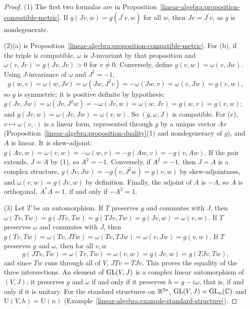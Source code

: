 \begin{proof}
(1) The first two formulas are in Proposition~\ref{linear-algebra:proposition-compatible-metric}. If $g(Jv, w) = g(J^{\prime}v, w)$ for all $w$, then $Jv = J^{\prime}v$, as $g$ is nondegenerate.

(2)(a) is Proposition~\ref{linear-algebra:proposition-compatible-metric}. For (b), if the triple is compatible, $\omega$ is $J$-invariant by that proposition and $\omega(v, Jv) = g(Jv, Jv) > 0$ for
$v \neq 0$. Conversely, define $g(v, w) = \omega(v, Jw)$. Using $J$-invariance of $\omega$ and $J^2 = -1$,
\[
g(w, v) = \omega(w, Jv) = \omega(Jw, J^2v) = -\omega(Jw, v) = \omega(v, Jw) = g(v, w),
\]
so $g$ is symmetric; it is positive definite by hypothesis; $g(Jv, Jw) = \omega(Jv, J^2w) = -\omega(Jv, w) = \omega(w, Jv) = g(w, v) = g(v, w)$; and $g(Jv, w) = \omega(Jv, Jw) = \omega(v, w)$. So
$(g, \omega, J)$ is compatible. For (c), $v \mapsto \omega(v, \cdot)$ is a linear form, represented through $g$ by a unique vector $Av$ (Proposition~\ref{linear-algebra:proposition-duality}(1) and
nondegeneracy of $g$), and $A$ is linear. It is skew-adjoint: $g(Av, w) = \omega(v, w) = -\omega(w, v) = -g(Aw, v) = -g(v, Aw)$. If the pair extends, $J = A$ by (1), so $A^2 = -1$. Conversely, if
$A^2 = -1$, then $J = A$ is a complex structure, $g(Jv, Jw) = -g(v, J^2w) = g(v, w)$ by skew-adjointness, and $\omega(v, w) = g(Jv, w)$ by definition. Finally, the adjoint of $A$ is $-A$, so $A$ is
orthogonal, $A^*A = 1$, if and only if $-A^2 = 1$.

(3) Let $T$ be an automorphism. If $T$ preserves $g$ and commutes with $J$, then $\omega(Tv, Tw) = g(JTv, Tw) = g(TJv, Tw) = g(Jv, w) = \omega(v, w)$. If $T$ preserves $\omega$ and commutes with $J$, then
$g(Tv, Tw) = \omega(Tv, JTw) = \omega(Tv, TJw) = \omega(v, Jw) = g(v, w)$. If $T$ preserves $g$ and $\omega$, then for all $v, w$
\[
g(JTv, Tw) = \omega(Tv, Tw) = \omega(v, w) = g(Jv, w) = g(TJv, Tw),
\]
and since $Tw$ runs through all of $V$, $JTv = TJv$. This proves the equality of the three intersections. An element of $\mathrm{GL}(V, J)$ is a complex linear automorphism of $(V, J)$; it preserves $g$ and
$\omega$ if and only if it preserves $h = g - i\omega$, that is, if and only if it is unitary. For the standard structures on $\mathbb{R}^{2n}$, $\mathrm{GL}(V, J) = \mathrm{GL}_n(\mathbb{C})$ and $\mathrm{U}(V, h) = \mathrm{U}(n)$
(Example~\ref{linear-algebra:example-standard-structure}).
\end{proof}

